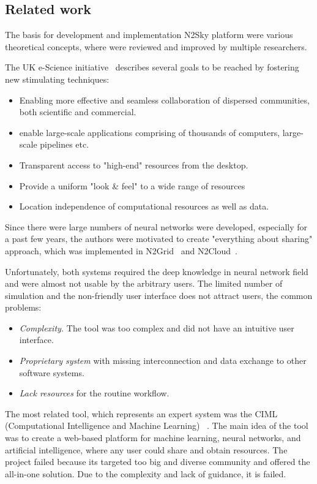 \subsection{Related work}\label{Related work}

The basis for development and implementation N2Sky platform were various theoretical concepts, where were reviewed and improved by multiple researchers.

The UK e-Science initiative~\cite{UKeS} describes several goals to be reached by fostering new stimulating techniques:

\begin{itemize}
  \item Enabling more effective and seamless collaboration of dispersed communities, both scientific and commercial.
  \item enable large-scale applications comprising of thousands of computers, large-scale pipelines etc.
  \item Transparent access to "high-end" resources from the desktop.
  \item Provide a uniform "look \& feel" to a wide range of resources
  \item Location independence of computational resources as well as data. 
\end{itemize}

Since there were large numbers of neural networks were developed, especially for a past few years, the authors were motivated to create "everything about sharing" approach, which was implemented in N2Grid~\cite{schikuta2004n2grid} and N2Cloud~\cite{huqqani2010n2cloud}.

Unfortunately, both systems required the deep knowledge in neural network field and were almost not usable by the arbitrary users.  The limited number of simulation and the non-friendly user interface does not attract users, the common problems:

\begin{itemize}
\item \emph{Complexity.} The tool was too complex and did not have an intuitive user interface. 
\item \emph{Proprietary system} with missing interconnection and data exchange to other software systems.
\item \emph{Lack resources} for the routine workflow.
\end{itemize}

The most related tool, which represents an expert system was the CIML (Computational Intelligence and Machine Learning) ~\cite{zurada2009building}. The main idea of the tool was to create a web-based platform for machine learning, neural networks, and artificial intelligence, where any user could share and obtain resources. The project failed because its targeted too big and diverse community and offered the all-in-one solution. Due to the complexity and lack of guidance, it is failed. 

